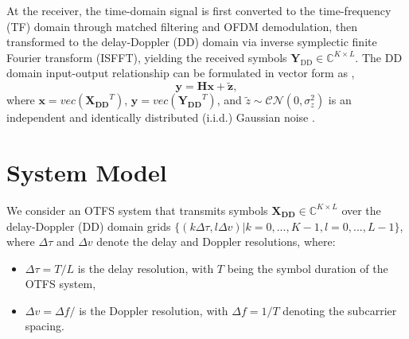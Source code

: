 \documentclass{article}
\begin{document}
At the receiver, the time-domain signal is first converted to the time-frequency (TF) domain through matched filtering and OFDM demodulation, then transformed to the delay-Doppler (DD) domain via inverse symplectic finite Fourier transform (ISFFT), yielding the received symbols $\bm{Y}_{\text{DD}}\in \mathbb{C}^{K\times L}$. The DD domain input-output relationship can be formulated in vector form as \cite{10264119},
\begin{equation}
\bm{y} = \bm{Hx} + \bm{\tilde{z}},
\label{eq:sys-DD}
\end{equation}
where $\bm{x} = vec(\bm{X_{DD}}^T)$, $\bm{y} = vec(\bm{Y_{DD}}^T)$, and $\tilde{z} \sim \mathcal{CN}(0, \sigma_z^2)$ is an independent and identically distributed (i.i.d.) Gaussian noise \cite{8516353, 10264119, 7925924}.

\section{System Model}
We consider an OTFS system that transmits symbols $\bm{X_{DD}}\in \mathbb{C}^{K\times L}$ over the delay-Doppler (DD) domain grids $\{(k\Delta\tau, l\Delta v)|k=0,...,K-1, l=0,...,L-1\}$, where $\Delta\tau$ and $\Delta v$ denote the delay and Doppler resolutions, where:
\begin{itemize}[label={--}] %
    \item $\Delta\tau=T/L$ is the delay resolution, with $T$ being the symbol duration of the OTFS system,
    \item $\Delta v=\Delta f/$ is the Doppler resolution, with $\Delta f=1/T$ denoting the subcarrier spacing.
\end{itemize}
\end{document}
